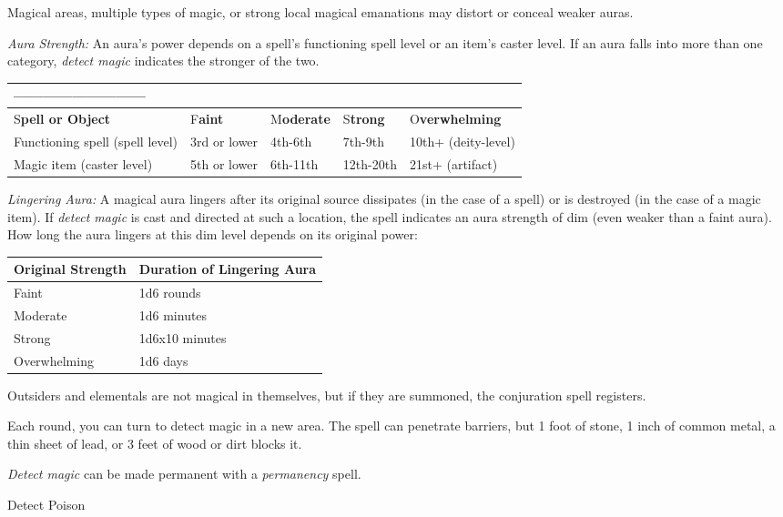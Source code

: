 \documentclass{article}
\begin{document}
Magical areas, multiple types of magic, or strong local magical emanations may 
distort or conceal weaker auras.

\textit{Aura Strength: }An aura's power depends on a spell's functioning spell 
level or an item's caster level. If an aura falls into more than one category, 
\textit{detect magic }indicates the stronger of the two.

\begin{tabular}{|>{\raggedright}p{107pt}|>{\raggedright}p{43pt}|>{\raggedright}p{36pt}|>{\raggedright}p{35pt}|>{\raggedright}p{67pt}|}
\hline
 --------------------------- & \multicolumn{4}{p{182pt}|}{ \textbf{Aura Power ---------------------------}}\tabularnewline
\hline
S\textbf{pell or Object} & F\textbf{aint} & M\textbf{oderate} & S\textbf{trong} & O\textbf{verwhelming}\tabularnewline
\hline
Functioning spell (spell level) & 3rd or lower & 4th-6th & 7th-9th & 10th+ (deity-level)\tabularnewline
\hline
Magic item (caster level) & 5th or lower & 6th-11th & 12th-20th & 21st+ (artifact)\tabularnewline
\hline
\end{tabular}

\textit{Lingering Aura: }A magical aura lingers after its original source dissipates 
(in the case of a spell) or is destroyed (in the case of a magic item). If \textit{detect 
magic }is cast and directed at such a location, the spell indicates an aura strength 
of dim (even weaker than a faint aura). How long the aura lingers at this dim level 
depends on its original power:

\begin{tabular}{|>{\raggedright}p{74pt}|>{\raggedright}p{118pt}|}
\hline
O\textbf{riginal Strength} & D\textbf{uration of Lingering Aura}\tabularnewline
\hline
Faint & 1d6 rounds\tabularnewline
\hline
Moderate & 1d6 minutes\tabularnewline
\hline
Strong & 1d6x10 minutes\tabularnewline
\hline
Overwhelming & 1d6 days\tabularnewline
\hline
\end{tabular}

Outsiders and elementals are not magical in themselves, but if they are summoned, 
the conjuration spell registers.

Each round, you can turn to detect magic in a new area. The spell can penetrate 
barriers, but 1 foot of stone, 1 inch of common metal, a thin sheet of lead, or 
3 feet of wood or dirt blocks it.

\textit{Detect magic }can be made permanent with a \textit{permanency }spell.

\vspace{12pt}
Detect Poison
\end{document}
